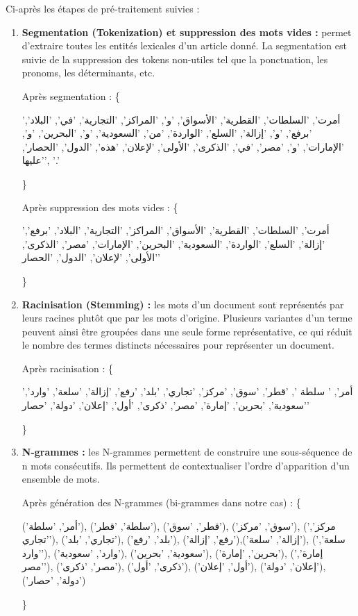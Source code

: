         Ci-après les étapes de pré-traitement suivies :
        \begin{enumerate}[leftmargin=*]
            \item{\textbf{Segmentation (Tokenization) et suppression des mots vides :} }permet d'extraire toutes les entités lexicales d'un article donné. La segmentation est suivie de la suppression des tokens non-utiles tel que la ponctuation, les pronoms, les déterminants, etc.

            Après segmentation : \{
                \begin{arab}'أمرت', 'السلطات', 'القطرية', 'الأسواق', 'و', 'المراكز', 'التجارية', 'في', 'البلاد', 'برفع', 'و', 'إزالة', 'السلع', 'الواردة', 'من', 'السعودية', 'و', 'البحرين', 'و', 'الإمارات', 'و', 'مصر', 'في', 'الذكرى', 'الأولى', 'لإعلان', 'هذه', 'الدول', 'الحصار', 'عليها', '.'\end{arab}
            \}

            Après suppression des mots vides : \{
            \begin{arab}'أمرت', 'السلطات', 'القطرية', 'الأسواق', 'المراكز', 'التجارية', 'البلاد', 'برفع', 'إزالة', 'السلع', 'الواردة', 'السعودية', 'البحرين', 'الإمارات', 'مصر', 'الذكرى', 'الأولى', 'لإعلان', 'الدول', 'الحصار'\end{arab}
            \}\\
            
            \item{\textbf{Racinisation (Stemming) :} }les mots d'un document sont représentés par leurs racines plutôt que par les mots d'origine. Plusieurs variantes d'un terme peuvent ainsi être groupées dans une seule forme représentative, ce qui réduit le nombre des termes distincts nécessaires pour représenter un document.

            Après racinisation : \{
            \begin{arab}'أمر', ' سلطة ', 'قطر', 'سوق', 'مركز', 'تجاري', 'بلد', 'رفع', 'إزالة', 'سلعة', 'وارد', 'سعودية', 'بحرين', 'إمارة', 'مصر', 'ذكرى', 'أول', 'إعلان', 'دولة', 'حصار'\end{arab}
            \}\\

            \item{\textbf{N-grammes :} }les N-grammes permettent de construire une sous-séquence de n mots consécutifs. Ils permettent de contextualiser l'ordre d'apparition d'un ensemble de mots.

            Après génération des N-grammes (bi-grammes dans notre cas) : \{
            \begin{arab}('أمر', 'سلطة'), ('سلطة', 'قطر'), ('قطر', 'سوق'), ('سوق', 'مركز'), ('مركز', 'تجاري'), ('تجاري', 'بلد'), ('بلد', 'رفع'), ('رفع', 'إزالة'),('إزالة', 'سلعة'), ('سلعة', 'وارد'), ('وارد', 'سعودية'), ('سعودية', 'بحرين'), ('بحرين', 'إمارة'), ('إمارة', 'مصر'), ('مصر', 'ذكرى'), ('ذكرى', 'أول'), ('أول', 'إعلان'), ('إعلان', 'دولة'), ('دولة', 'حصار')\end{arab}
            \}\\
        \end{enumerate}
